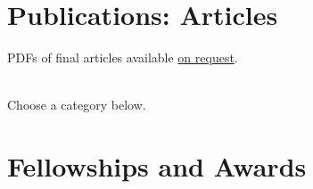 \documentclass[11pt]{article}
\makeatletter
\newcommand{\onrequest}{\href{mailto:bhelm@fandm.edu}{on request}}
\makeatother
\begin{document}
\nocite{Helm2017Communities-Respect-Persons,Helm2010Love-Friendship-Self,Helm2001Emotional-Reason-Deliberation}

\printbibliography[heading=none]

\section[Articles]{Publications: Articles}

\newrefsection
\nocite{*}


\begin{center}
  PDFs of final articles available \onrequest{}.\\
  ~
\end{center}

Choose a category below.

\printbibliography[filter=myarticle, heading=none]




\section[Awards]{Fellowships and Awards}
\end{document}
